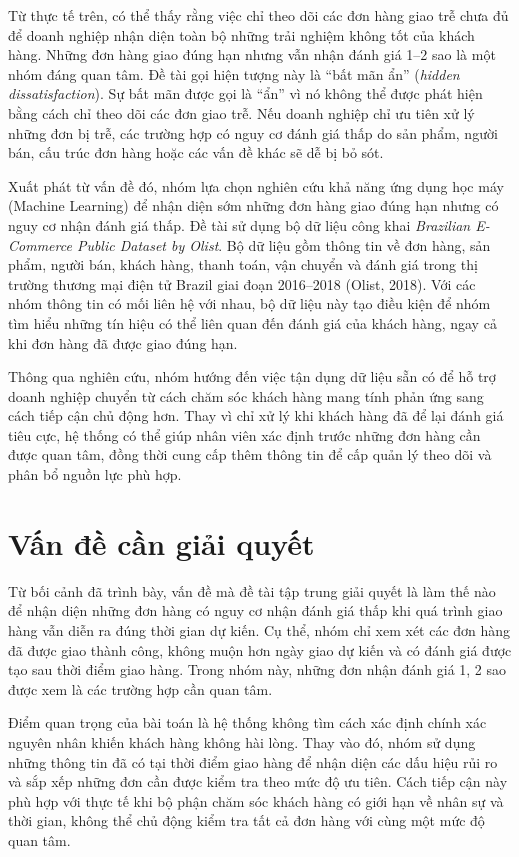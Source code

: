 \documentclass[12pt,a4paper]{report}
\begin{document}
Từ thực tế trên, có thể thấy rằng việc chỉ theo dõi các đơn hàng giao trễ chưa đủ để doanh nghiệp nhận diện toàn bộ những trải nghiệm không tốt của khách hàng. Những đơn hàng giao đúng hạn nhưng vẫn nhận đánh giá 1--2 sao là một nhóm đáng quan tâm. Đề tài gọi hiện tượng này là ``bất mãn ẩn'' (\emph{hidden dissatisfaction}). Sự bất mãn được gọi là ``ẩn'' vì nó không thể được phát hiện bằng cách chỉ theo dõi các đơn giao trễ. Nếu doanh nghiệp chỉ ưu tiên xử lý những đơn bị trễ, các trường hợp có nguy cơ đánh giá thấp do sản phẩm, người bán, cấu trúc đơn hàng hoặc các vấn đề khác sẽ dễ bị bỏ sót.

Xuất phát từ vấn đề đó, nhóm lựa chọn nghiên cứu khả năng ứng dụng học máy (Machine Learning) để nhận diện sớm những đơn hàng giao đúng hạn nhưng có nguy cơ nhận đánh giá thấp. Đề tài sử dụng bộ dữ liệu công khai \emph{Brazilian E-Commerce Public Dataset by Olist}. Bộ dữ liệu gồm thông tin về đơn hàng, sản phẩm, người bán, khách hàng, thanh toán, vận chuyển và đánh giá trong thị trường thương mại điện tử Brazil giai đoạn 2016--2018 (Olist, 2018). Với các nhóm thông tin có mối liên hệ với nhau, bộ dữ liệu này tạo điều kiện để nhóm tìm hiểu những tín hiệu có thể liên quan đến đánh giá của khách hàng, ngay cả khi đơn hàng đã được giao đúng hạn.

Thông qua nghiên cứu, nhóm hướng đến việc tận dụng dữ liệu sẵn có để hỗ trợ doanh nghiệp chuyển từ cách chăm sóc khách hàng mang tính phản ứng sang cách tiếp cận chủ động hơn. Thay vì chỉ xử lý khi khách hàng đã để lại đánh giá tiêu cực, hệ thống có thể giúp nhân viên xác định trước những đơn hàng cần được quan tâm, đồng thời cung cấp thêm thông tin để cấp quản lý theo dõi và phân bổ nguồn lực phù hợp.

\section{Vấn đề cần giải quyết}
\label{sec:van-de}

Từ bối cảnh đã trình bày, vấn đề mà đề tài tập trung giải quyết là làm thế nào để nhận diện những đơn hàng có nguy cơ nhận đánh giá thấp khi quá trình giao hàng vẫn diễn ra đúng thời gian dự kiến. Cụ thể, nhóm chỉ xem xét các đơn hàng đã được giao thành công, không muộn hơn ngày giao dự kiến và có đánh giá được tạo sau thời điểm giao hàng. Trong nhóm này, những đơn nhận đánh giá 1, 2 sao được xem là các trường hợp cần quan tâm.

Điểm quan trọng của bài toán là hệ thống không tìm cách xác định chính xác nguyên nhân khiến khách hàng không hài lòng. Thay vào đó, nhóm sử dụng những thông tin đã có tại thời điểm giao hàng để nhận diện các dấu hiệu rủi ro và sắp xếp những đơn cần được kiểm tra theo mức độ ưu tiên. Cách tiếp cận này phù hợp với thực tế khi bộ phận chăm sóc khách hàng có giới hạn về nhân sự và thời gian, không thể chủ động kiểm tra tất cả đơn hàng với cùng một mức độ quan tâm.
\end{document}
